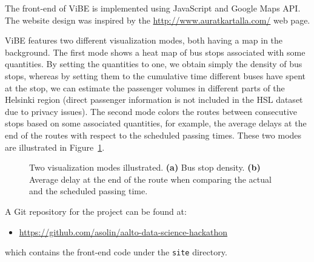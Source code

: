 \documentclass[a4paper,12pt]{article}
\begin{document}
The front-end of ViBE is implemented using JavaScript and Google Maps API. The 
website design was inspired by the \url{http://www.auratkartalla.com/} web page.

ViBE features two different visualization modes, both having a map in the 
background. The first mode shows a heat map of bus stops associated with some 
quantities. By setting the quantities to one, we obtain simply the density of 
bus stops, whereas by setting them to the cumulative time different buses 
have spent at the stop, we can estimate the passenger volumes in 
different parts of the Helsinki region (direct passenger information is not 
included in the HSL dataset due to privacy issues). The second mode colors the 
routes between consecutive stops based on some associated quantities, for 
example, the average delays at the end of the routes with respect to the 
scheduled passing times. These two modes are illustrated in 
Figure~\ref{fig:modes}.

\begin{figure}
\centering     %
{}
\caption{Two visualization modes illustrated. \textbf{(a)} Bus stop density. 
\textbf{(b)} Average delay at the end of the route when comparing the actual 
and the scheduled passing time.}
\label{fig:modes}
\end{figure}

A Git repository for the project can be found at:
\begin{itemize}
\item[] \url{https://github.com/asolin/aalto-data-science-hackathon}
\end{itemize}
which contains the front-end code under the \texttt{site} directory.
\end{document}
